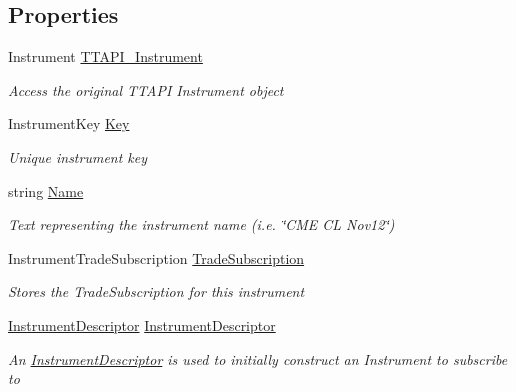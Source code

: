 \subsection*{Properties}
\begin{DoxyCompactItemize}
\item 
Instrument \hyperlink{class_e_z_a_p_i_1_1_containers_1_1_t_t_instrument_a0f1e4c47d7b6512a6f605826b2d13fc1}{T\-T\-A\-P\-I\-\_\-\-Instrument}
\begin{DoxyCompactList}\small\item\em Access the original T\-T\-A\-P\-I Instrument object \end{DoxyCompactList}\item 
Instrument\-Key \hyperlink{class_e_z_a_p_i_1_1_containers_1_1_t_t_instrument_afd9710cbbcb94497b8aa7cfb392a27ac}{Key}
\begin{DoxyCompactList}\small\item\em Unique instrument key \end{DoxyCompactList}\item 
string \hyperlink{class_e_z_a_p_i_1_1_containers_1_1_t_t_instrument_a87cf4ed780ad325b1f838ee97c043fe3}{Name}
\begin{DoxyCompactList}\small\item\em Text representing the instrument name (i.\-e. \char`\"{}\-C\-M\-E C\-L Nov12\char`\"{}) \end{DoxyCompactList}\item 
Instrument\-Trade\-Subscription \hyperlink{class_e_z_a_p_i_1_1_containers_1_1_t_t_instrument_a46b5d383d32fccba805b1d38edbbf27d}{Trade\-Subscription}
\begin{DoxyCompactList}\small\item\em Stores the Trade\-Subscription for this instrument \end{DoxyCompactList}\item 
\hyperlink{class_e_z_a_p_i_1_1_containers_1_1_instrument_descriptor}{Instrument\-Descriptor} \hyperlink{class_e_z_a_p_i_1_1_containers_1_1_t_t_instrument_ae2974cc8462657c2232b5bf1b886c91d}{Instrument\-Descriptor}
\begin{DoxyCompactList}\small\item\em An \hyperlink{class_e_z_a_p_i_1_1_containers_1_1_instrument_descriptor}{Instrument\-Descriptor} is used to initially construct an Instrument to subscribe to \end{DoxyCompactList}\item 

\end{DoxyCompactItemize}
